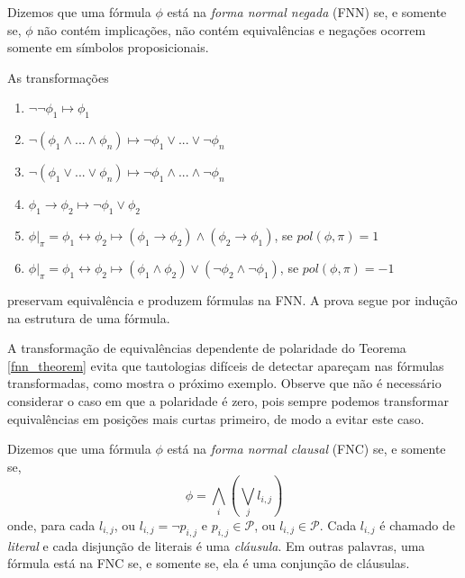 \begin{definition}
    Dizemos que uma fórmula $\phi$ está na \emph{forma normal negada} (FNN) se, e somente se, $\phi$ não contém implicações, não contém equivalências e negações ocorrem somente em símbolos proposicionais.
\end{definition}

\begin{theorem}
    \label{fnn_theorem}
    As transformações
    \begin{enumerate}
        \item $\neg \neg \phi_1 \longmapsto \phi_1$
        \item $\neg(\phi_1 \wedge ... \wedge \phi_n) \longmapsto \neg \phi_1 \vee ... \vee \neg \phi_n$
        \item $\neg(\phi_1 \vee ... \vee \phi_n) \longmapsto \neg \phi_1 \wedge ... \wedge \neg \phi_n$
        \item $\phi_1 \rightarrow \phi_2 \longmapsto \neg \phi_1 \vee \phi_2$
        \item $\phi|_\pi = \phi_1 \leftrightarrow \phi_2 \longmapsto (\phi_1 \rightarrow \phi_2) \wedge (\phi_2 \rightarrow \phi_1)$, se $pol(\phi,\pi) = 1$
        \item $\phi|_\pi = \phi_1 \leftrightarrow \phi_2 \longmapsto (\phi_1 \wedge \phi_2) \vee (\neg \phi_2 \wedge \neg \phi_1)$, se $pol(\phi,\pi) = -1$
    \end{enumerate}
    preservam equivalência e produzem fórmulas na FNN. A prova segue por indução na estrutura de uma fórmula.
\end{theorem}

A transformação de equivalências dependente de polaridade do Teorema \ref{fnn_theorem} evita que tautologias difíceis de detectar apareçam nas fórmulas transformadas, como mostra o próximo exemplo. Observe que não é necessário considerar o caso em que a polaridade é zero, pois sempre podemos transformar equivalências em posições mais curtas primeiro, de modo a evitar este caso.

\begin{definition}
    Dizemos que uma fórmula $\phi$ está na \emph{forma normal clausal} (FNC) se, e somente se, $$\phi = \bigwedge_i \left( \bigvee_j l_{i,j} \right)$$ onde, para cada $l_{i,j}$, ou $l_{i,j} = \neg p_{i,j}$ e $p_{i,j} \in \mathcal{P}$, ou $l_{i,j} \in \mathcal{P}$. Cada $l_{i,j}$ é chamado de \emph{literal} e cada disjunção de literais é uma \emph{cláusula}. Em outras palavras, uma fórmula está na FNC se, e somente se, ela é uma conjunção de cláusulas.
\end{definition}

